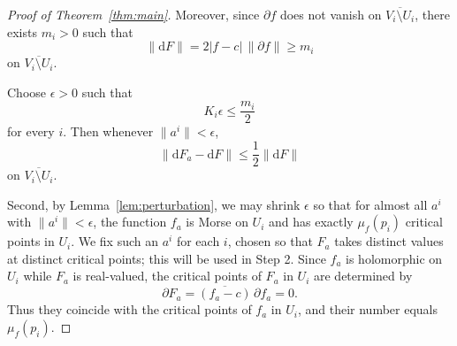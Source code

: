 \documentclass[11pt]{amsart}
\theoremstyle{plain}
\theoremstyle{definition}
\theoremstyle{remark}
\numberwithin{equation}{section}
\begin{document}
\begin{proof}[Proof of Theorem~\ref{thm:main}]
    Moreover, since $\partial f$ does not vanish on $\overline{V_i \setminus U_i}$, there exists $m_i > 0$ such that
    \begin{equation}
        \|\mathrm{d}F\| = 2|f-c|\,\|\partial f\| \ge m_i
    \end{equation}
    on $\overline{V_i \setminus U_i}$.

    Choose $\epsilon > 0$ such that
    \begin{equation}
        K_i \epsilon \le \frac{m_i}{2}
    \end{equation}
    for every $i$.
    Then whenever $\|a^i\| < \epsilon$,
    \begin{equation}
        \|\mathrm{d}F_a - \mathrm{d}F\| \le \frac{1}{2}\|\mathrm{d}F\|
    \end{equation}
    on $\overline{V_i \setminus U_i}$.

    Second, by Lemma~\ref{lem:perturbation}, we may shrink $\epsilon$ so that for almost all $a^i$ with $\|a^i\| < \epsilon$, the function $f_a$ is Morse on $U_i$ and has exactly $\mu_f(p_i)$ critical points in $U_i$.
    We fix such an $a^i$ for each $i$, chosen so that $F_a$ takes distinct values at distinct critical points; this will be used in Step 2.
    Since $f_a$ is holomorphic on $U_i$ while $F_a$ is real-valued, the critical points of $F_a$ in $U_i$ are determined by
    \begin{equation}
        \partial F_a = \overline{(f_a - c)}\,\partial f_a = 0.
    \end{equation}
    Thus they coincide with the critical points of $f_a$ in $U_i$, and their number equals $\mu_f(p_i)$.


\end{proof}
\end{document}
